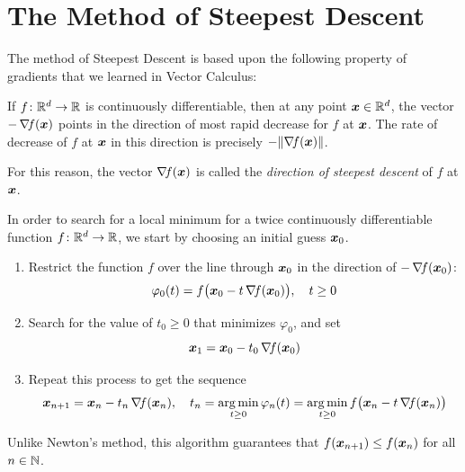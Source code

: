 
\section{The Method of Steepest Descent}

The method of Steepest Descent is based upon the following property of gradients that we learned in Vector Calculus:

\begin{theorem}
If $f \colon \mathbb{R}^d \to \mathbb{R}$ is continuously differentiable, then at any point $\boldsymbol{x} \in \mathbb{R}^d$, the vector $-\mathop{\nabla\! {f}}(\boldsymbol{x})$ points in the direction of most rapid decrease for $f$ at $\boldsymbol{x}$.  The rate of decrease of $f$ at $\boldsymbol{x}$ in this direction is precisely $-\lVert \mathop{\nabla\! {f}}(\boldsymbol{x}) \rVert$.
\end{theorem}

\begin{remark}
For this reason, the vector $\mathop{\nabla\! {f}}(\boldsymbol{x})$ is called the \emph{direction of steepest descent} of $f$ at $\boldsymbol{x}$.
\end{remark}

In order to search for a local minimum for a twice continuously differentiable function $f\colon \mathbb{R}^d \to \mathbb{R}$, we start by choosing an initial guess $\boldsymbol{x}_0$.  
\begin{enumerate}
	\item Restrict the function $f$ over the line through $\boldsymbol{x}_0$ in the direction of $-\mathop{\nabla\! {f}}(\boldsymbol{x}_0)$:
	\begin{equation*}
	\varphi_0(t) = f\big( \boldsymbol{x}_0 - t \mathop{\nabla\! {f}}(\boldsymbol{x}_0) \big), \quad t\geq 0
	\end{equation*}
	\item Search for the value of $t_0 \geq 0$ that minimizes $\varphi_0$, and set 
	\begin{equation*}
	\boldsymbol{x}_1 = \boldsymbol{x}_0 - t_0\mathop{\nabla\! {f}}(\boldsymbol{x}_0)
	\end{equation*}
	\item Repeat this process to get the sequence
	\begin{equation*}
	\boldsymbol{x}_{n+1} = \boldsymbol{x}_n - t_n \mathop{\nabla\! {f}}(\boldsymbol{x}_n), \quad t_n = \operatorname*{arg\,min}_{t\geq 0} \varphi_n(t) = \operatorname*{arg\,min}_{t\geq 0} f\big(\boldsymbol{x}_n - t\mathop{\nabla\! {f}}(\boldsymbol{x}_n)\big)
	\end{equation*}
\end{enumerate}

\begin{remark}
Unlike Newton's method, this algorithm guarantees that $f(\boldsymbol{x}_{n+1}) \leq f(\boldsymbol{x}_n)$ for all $n \in \mathbb{N}$.
\end{remark}

